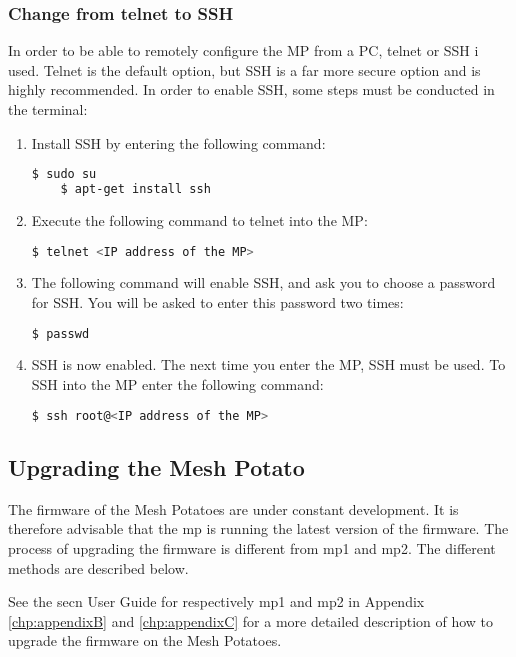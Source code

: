 \subsubsection{Change from telnet to SSH}
\label{subsubsec:ssh}
In order to be able to remotely configure the MP from a PC, telnet or SSH i used. Telnet is the default option, but SSH is a far more secure option and is highly recommended. In order to enable SSH, some steps must be conducted in the terminal:
\begin{enumerate}
\item Install SSH by entering the following command:
\noindent
\begin{lstlisting}[language=bash]
	$ sudo su
	$ apt-get install ssh
\end{lstlisting}
\item Execute the following command to telnet into the MP:
\noindent
\begin{lstlisting}[language=bash]
	$ telnet <IP address of the MP>
\end{lstlisting}
\item The following command will enable SSH, and ask you to choose a password for SSH. You will be asked to enter this password two times:
\noindent
\begin{lstlisting}[language=bash]
	$ passwd
\end{lstlisting}
\item SSH is now enabled. The next time you enter the MP, SSH must be used. To SSH into the MP enter the following command:
\noindent
\begin{lstlisting}[language=bash]
	$ ssh root@<IP address of the MP>
\end{lstlisting}
\end{enumerate}


\subsection{Upgrading the Mesh Potato}
\label{subsec:upgrading}
The firmware of the Mesh Potatoes are under constant development. It is therefore advisable that the \gls{mp} is running the latest version of the firmware. The process of upgrading the firmware is different from \gls{mp1} and \gls{mp2}. The different methods are described below. 

See the \gls{secn} User Guide for respectively \gls{mp1} and \gls{mp2} in Appendix \ref{chp:appendixB} and \ref{chp:appendixC} for a more detailed description of how to upgrade the firmware on the Mesh Potatoes.

